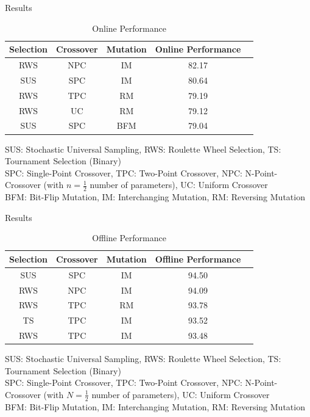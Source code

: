 \documentclass{beamer}
\begin{document}
\begin{frame}{Results}
\begin{table}
\begin{tabular}{c | c | c | c | c }
Selection & Crossover & Mutation & Online Performance \\
\hline \hline
RWS & NPC & IM & 82.17 \\
SUS & SPC & IM & 80.64 \\
RWS & TPC & RM & 79.19 \\
RWS & UC & RM & 79.12 \\
SUS & SPC & BFM & 79.04
\end{tabular}
\caption{Online Performance}
\end{table}

SUS: Stochastic Universal Sampling, RWS: Roulette Wheel Selection, TS: Tournament Selection (Binary) \\
SPC: Single-Point Crossover, TPC: Two-Point Crossover, NPC: N-Point-Crossover (with $n=\frac{1}{2}$ number of parameters), UC: Uniform Crossover \\
BFM: Bit-Flip Mutation, IM: Interchanging Mutation, RM: Reversing Mutation

\end{frame}


\begin{frame}{Results}
\begin{table}
\begin{tabular}{c | c | c | c | c }
Selection & Crossover & Mutation & Offline Performance \\
\hline
SUS & SPC & IM & 94.50 \\
RWS & NPC & IM & 94.09 \\
RWS & TPC & RM & 93.78 \\
TS & TPC & IM & 93.52 \\
RWS & TPC & IM & 93.48
\end{tabular}
\caption{Offline Performance}
\end{table}


SUS: Stochastic Universal Sampling, RWS: Roulette Wheel Selection, TS: Tournament Selection (Binary) \\
SPC: Single-Point Crossover, TPC: Two-Point Crossover, NPC: N-Point-Crossover (with $N=\frac{1}{2}$ number of parameters), UC: Uniform Crossover \\
BFM: Bit-Flip Mutation, IM: Interchanging Mutation, RM: Reversing Mutation

\end{frame}
\end{document}
